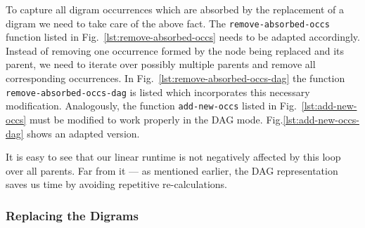 \documentclass[12pt]{llncs}
\newcommand{\tp}{digram\xspace}
\newcommand{\ltps}{Digrams\xspace}
\begin{document}
To capture all \tp occurrences which are absorbed by the replacement of a \tp we need to take care of the above fact. The \texttt{remove-absorbed-occs} function listed in Fig.~\ref{lst:remove-absorbed-occs} needs to be adapted accordingly. Instead of removing one occurrence formed by the node being replaced and its parent, we need to iterate over possibly multiple parents and remove all corresponding occurrences. In Fig.~\ref{lst:remove-absorbed-occs-dag} the function \texttt{remove-absorbed-occs-dag} is listed which incorporates this necessary modification. Analogously, the function \texttt{add-new-occs} listed in Fig.~\ref{lst:add-new-occs} must be modified to work properly in the DAG mode. Fig.\ref{lst:add-new-occs-dag} shows an adapted version.

It is easy to see that our linear runtime is not negatively affected by this loop over all parents. Far from it --- as mentioned earlier, the DAG representation saves us time by avoiding repetitive re-calculations.

\subsubsection{Replacing the \ltps} 
\end{document}
